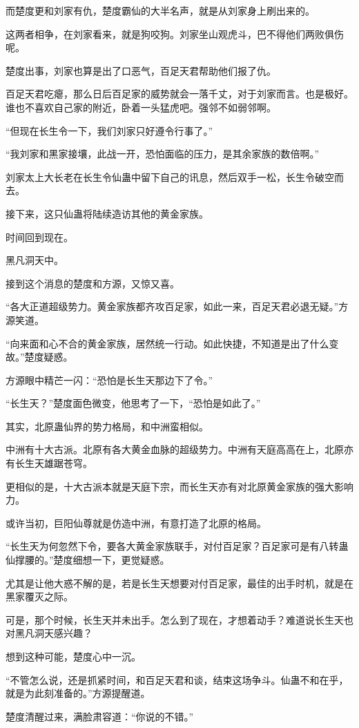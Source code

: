 \begin{this_body}
而楚度更和刘家有仇，楚度霸仙的大半名声，就是从刘家身上刷出来的。

这两者相争，在刘家看来，就是狗咬狗。刘家坐山观虎斗，巴不得他们两败俱伤呢。

楚度出事，刘家也算是出了口恶气，百足天君帮助他们报了仇。

百足天君吃瘪，那么日后百足家的威势就会一落千丈，对于刘家而言。也是极好。谁也不喜欢自己家的附近，卧着一头猛虎吧。强邻不如弱邻啊。

“但现在长生令一下，我们刘家只好遵令行事了。”

“我刘家和黑家接壤，此战一开，恐怕面临的压力，是其余家族的数倍啊。”

刘家太上大长老在长生令仙蛊中留下自己的讯息，然后双手一松，长生令破空而去。

接下来，这只仙蛊将陆续造访其他的黄金家族。

时间回到现在。

黑凡洞天中。

接到这个消息的楚度和方源，又惊又喜。

“各大正道超级势力。黄金家族都齐攻百足家，如此一来，百足天君必退无疑。”方源笑道。

“向来面和心不合的黄金家族，居然统一行动。如此快捷，不知道是出了什么变故。”楚度疑惑。

方源眼中精芒一闪：“恐怕是长生天那边下了令。”

“长生天？”楚度面色微变，他思考了一下，“恐怕是如此了。”

其实，北原蛊仙界的势力格局，和中洲蛮相似。

中洲有十大古派。北原有各大黄金血脉的超级势力。中洲有天庭高高在上，北原亦有长生天雄踞苍穹。

更相似的是，十大古派本就是天庭下宗，而长生天亦有对北原黄金家族的强大影响力。

或许当初，巨阳仙尊就是仿造中洲，有意打造了北原的格局。

“长生天为何忽然下令，要各大黄金家族联手，对付百足家？百足家可是有八转蛊仙撑腰的。”楚度细想一下，更觉疑惑。

尤其是让他大惑不解的是，若是长生天想要对付百足家，最佳的出手时机，就是在黑家覆灭之际。

可是，那个时候，长生天并未出手。怎么到了现在，才想着动手？难道说长生天也对黑凡洞天感兴趣？

想到这种可能，楚度心中一沉。

“不管怎么说，还是抓紧时间，和百足天君和谈，结束这场争斗。仙蛊不和在乎，就是为此刻准备的。”方源提醒道。

楚度清醒过来，满脸肃容道：“你说的不错。”


\end{this_body}
